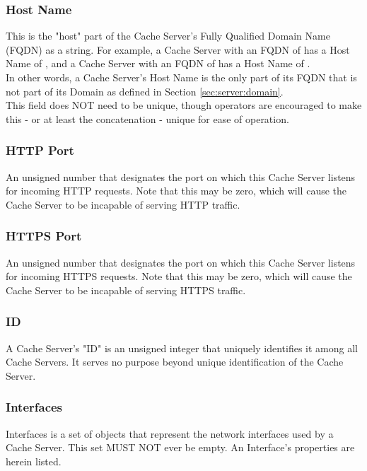 \subsubsection{Host Name\label{sec:server:hostname}}
This is the "host" part of the Cache Server's Fully Qualified Domain Name (FQDN)
as a string. For example, a Cache Server with an FQDN of  has a
Host Name of , and a Cache Server with an FQDN of
 has a Host Name of .\\
In other words, a Cache Server's Host Name is the only part of its FQDN that
is not part of its Domain as defined in Section \ref{sec:server:domain}.\\
This field does NOT need to be unique, though operators are encouraged to make
this - or at least the concatenation 
- unique for ease of operation.

\subsubsection{HTTP Port}
An unsigned number that designates the port on which this Cache Server listens
for incoming HTTP requests. Note that this may be zero, which will cause the
Cache Server to be incapable of serving HTTP traffic.

\subsubsection{HTTPS Port}
An unsigned number that designates the port on which this Cache Server listens
for incoming HTTPS requests. Note that this may be zero, which will cause the
Cache Server to be incapable of serving HTTPS traffic.

\subsubsection{ID}
A Cache Server's "ID" is an unsigned integer that uniquely identifies it among
all Cache Servers. It serves no purpose beyond unique identification of the
Cache Server.

\subsubsection{Interfaces}
Interfaces is a set of objects that represent the network interfaces used by a
Cache Server. This set MUST NOT ever be empty. An Interface's properties are
herein listed.


